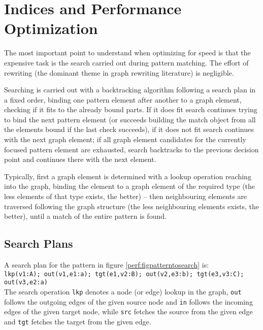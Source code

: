 \chapter{Indices and Performance Optimization}\label{cha:performance} 

The most important point to understand when optimizing for speed is that the expensive task is the search carried out during pattern matching. The effort of rewriting (the dominant theme in graph rewriting literature) is negligible.

Searching is carried out with a backtracking algorithm following a search plan in a fixed order, 
binding one pattern element after another to a graph element, checking if it fits to the already bound parts.
If it does fit search continues trying to bind the next pattern element (or succeeds building the match object from all the elements bound if the last check succeeds), if it does not fit search continues with the next graph element; if all graph element candidates for the currently focused pattern element are exhausted, search backtracks to the previous decision point and continues there with the next element.

Typically, first a graph element is determined with a lookup operation reaching into the graph, binding the element to a graph element of the required type (the less elements of that type exists, the better) -- then neighbouring elements are traversed following the graph structure (the less neighbouring elements exists, the better), until a match of the entire pattern is found.


\section{Search Plans}

A search plan for the pattern in figure \ref{perf:figpatterntosearch} is:\\
\texttt{lkp(v1:A); out(v1,e1:a); tgt(e1,v2:B); out(v2,e3:b); tgt(e3,v3:C); out(v3,e2:a)}\\
The search operation \texttt{lkp} denotes a node (or edge) lookup in the graph, \texttt{out} follows the outgoing edges of the given source node and \texttt{in} follows the incoming edges of the given target node, while \texttt{src} fetches the source from the given edge and \texttt{tgt} fetches the target from the given edge.

